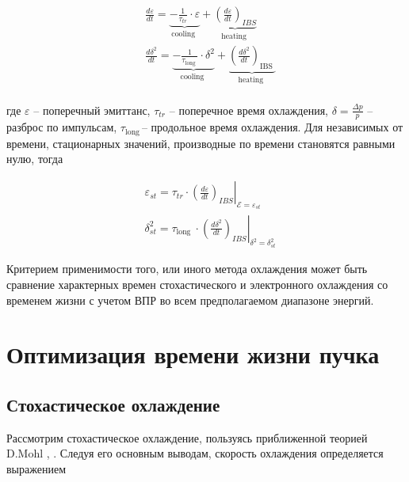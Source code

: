 \begin{equation}
\begin{aligned}
& \frac{d \varepsilon}{d t}=\underbrace{-\frac{1}{\tau_{t r}} \cdot \varepsilon}_{\text {cooling }}+\underbrace{\left(\frac{d \varepsilon}{d t}\right)_{I B S}}_{\text {heating }} \\
& \frac{d \delta^2}{d t}=\underbrace{-\frac{1}{\tau_{\text {long }}} \cdot \delta^2}_{\text {cooling }}+\underbrace{\left(\frac{d \delta^2}{d t}\right)_{\text {IBS }}}_{\text {heating }} \\
&
\end{aligned}
\end{equation}

\noindent где $\varepsilon$ – поперечный эмиттанс, $\tau_{tr}$ – поперечное время охлаждения, $\delta=\frac{\Delta p}{p}$ – разброс по импульсам, $\tau_{\mathrm{long\ }}$– продольное время охлаждения.
Для независимых от времени, стационарных значений, производные по времени становятся равными нулю, тогда

\begin{equation}
\begin{aligned}
& \varepsilon_{s t}=\left.\tau_{t r} \cdot\left(\frac{d \varepsilon}{d t}\right)_{I B S}\right|_{\mathcal{E}=\varepsilon_{s t}} \\
& \delta_{s t}^2=\left.\tau_{\text {long }} \cdot\left(\frac{d \delta^2}{d t}\right)_{I B S}\right|_{\delta^2=\delta_{s t}^2}
\end{aligned}
\end{equation}

Критерием применимости того, или иного метода охлаждения может быть сравнение характерных времен стохастического и электронного охлаждения со временем жизни с учетом ВПР во всем предполагаемом диапазоне энергий.

	\section{Оптимизация времени жизни пучка}
	
	\subsection{Стохастическое охлаждение}

\par Рассмотрим стохастическое охлаждение, пользуясь приближенной теорией D.Mohl \cite{mohl:stochastic, mohl:stochastic2}, . Следуя его основным выводам, скорость охлаждения определяется выражением		
	
